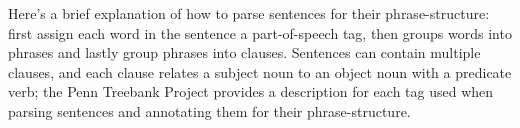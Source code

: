 Here's a brief explanation of how to parse sentences for their phrase-structure: first assign each word in the sentence a part-of-speech tag,
then groups words into phrases and lastly group phrases into clauses. Sentences can contain multiple clauses, and each clause relates a
subject noun to an object noun with a predicate verb; the Penn Treebank Project \cite{mihaisurdeanu2015} provides a description for each tag used when parsing sentences
and annotating them for their phrase-structure.
